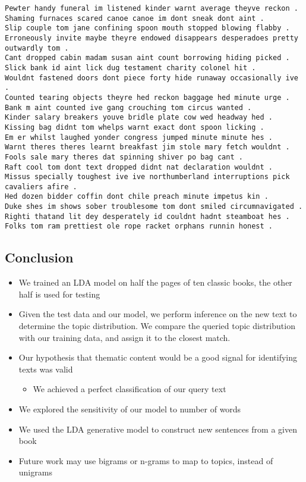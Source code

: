 \documentclass{article}
\begin{document}
    \begin{Verbatim}[commandchars=\\\{\}]
Pewter handy funeral im listened kinder warnt average theyve reckon .
Shaming furnaces scared canoe canoe im dont sneak dont aint .
Slip couple tom jane confining spoon mouth stopped blowing flabby .
Erroneously invite maybe theyre endowed disappears desperadoes pretty outwardly tom .
Cant dropped cabin madam susan aint count borrowing hiding picked .
Slick bank id aint lick dug testament charity colonel hit .
Wouldnt fastened doors dont piece forty hide runaway occasionally ive .
Counted tearing objects theyre hed reckon baggage hed minute urge .
Bank m aint counted ive gang crouching tom circus wanted .
Kinder salary breakers youve bridle plate cow wed headway hed .
Kissing bag didnt tom whelps warnt exact dont spoon licking .
Em er whilst laughed yonder congress jumped minute minute hes .
Warnt theres theres learnt breakfast jim stole mary fetch wouldnt .
Fools sale mary theres dat spinning shiver po bag cant .
Raft cool tom dont text dropped didnt nat declaration wouldnt .
Missus specially toughest ive ive northumberland interruptions pick cavaliers afire .
Hed dozen bidder coffin dont chile preach minute impetus kin .
Duke shes im shows sober troublesome tom dont smiled circumnavigated .
Righti thatand lit dey desperately id couldnt hadnt steamboat hes .
Folks tom ram prettiest ole rope racket orphans runnin honest .
    \end{Verbatim}

    \subsection{Conclusion}\label{conclusion}

    \begin{itemize}
\itemsep1pt\parskip0pt
\item
  We trained an LDA model on half the pages of ten classic books, the
  other half is used for testing
\item
  Given the test data and our model, we perform inference on the new
  text to determine the topic distribution. We compare the queried topic
  distribution with our training data, and assign it to the closest
  match.
\item
  Our hypothesis that thematic content would be a good signal for
  identifying texts was valid

  \begin{itemize}
  \itemsep1pt\parskip0pt
  \item
    We achieved a perfect classification of our query text
  \end{itemize}
\item
  We explored the sensitivity of our model to number of words
\item
  We used the LDA generative model to construct new sentences from a
  given book
\item
  Future work may use bigrams or n-grams to map to topics, instead of
  unigrams
\end{itemize}


    
    
    
    
\end{document}
